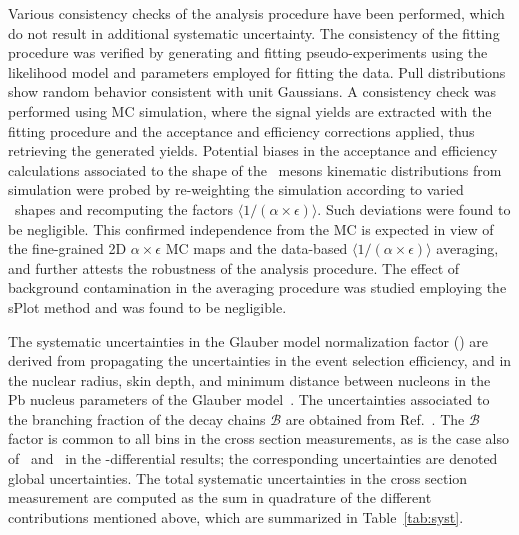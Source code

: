 \documentclass[11pt,twoside,a4paper,cmspaper]{cms-tdr}
\begin{document}
Various consistency checks of the analysis procedure have been performed, which do not result in additional systematic uncertainty.
%
The consistency of the fitting procedure was verified by generating and fitting pseudo-experiments using the likelihood model and parameters employed for fitting the data. Pull distributions show random behavior consistent with unit Gaussians.
%
A consistency check %
was performed using MC simulation, where the signal yields are extracted with the fitting procedure and the acceptance and efficiency corrections applied, thus retrieving the generated yields. 
%
Potential biases in the acceptance and efficiency calculations associated to the shape of the \PB\ mesons kinematic distributions from simulation were probed by re-weighting the  {\PYTHIA} simulation according to varied \pt\ shapes %
 and recomputing the factors $\langle 1 / (\alpha\!\times\!\epsilon)\rangle$. Such deviations were found to be negligible. 
This confirmed independence from the MC is expected in view of the fine-grained 2D $\alpha\!\times\!\epsilon$ MC maps and the data-based $\langle 1 / (\alpha\!\times\!\epsilon)\rangle$ averaging, and further attests the robustness of the analysis procedure. 
The effect of background contamination %
in the averaging procedure was studied employing the sPlot method and was found to be negligible.  

%
The systematic uncertainties in the Glauber model normalization factor (\TAA) are derived from propagating the uncertainties in the event selection efficiency, and in the nuclear radius, skin depth, and minimum distance between nucleons in the Pb nucleus parameters of the Glauber model~\cite{Khachatryan:2016odn}. The uncertainties associated to the branching fraction of the decay chains $\mathcal{B}$ are obtained from Ref.~\cite{pdg2018}.
%
The $\mathcal{B}$ factor is common to all bins in the cross section measurements, as is the case also of \TAA\ and \NMB\ in the \pt-differential results; the corresponding uncertainties are denoted global uncertainties.  
%
%
The total systematic uncertainties in the cross section measurement are computed as the sum in quadrature of the different contributions mentioned above, which are summarized in Table~\ref{tab:syst}. 
\end{document}
